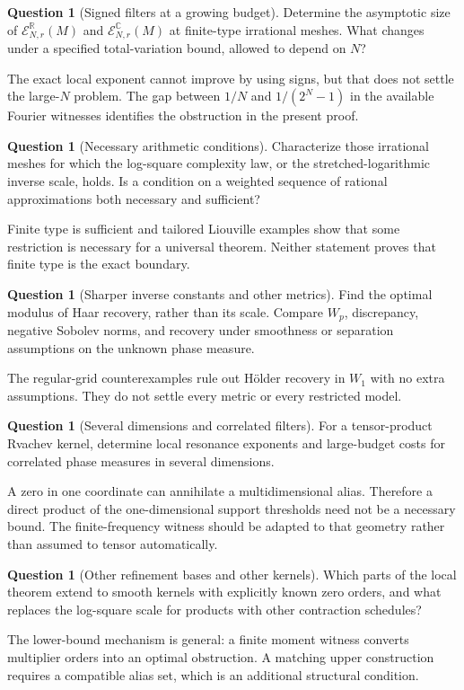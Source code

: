\documentclass[11pt,a4paper]{article}
\numberwithin{equation}{section}
\theoremstyle{plain}
\theoremstyle{definition}
\newtheorem{question}[theorem]{Question}
\theoremstyle{remark}
\newcommand{\R}{\mathbb R}\newcommand{\C}{\mathbb C}
\newcommand{\Err}{\mathcal E}
\begin{document}
\begin{question}[Signed filters at a growing budget]
Determine the asymptotic size of $\Err^{\R}_{N,r}(M)$ and
$\Err^{\C}_{N,r}(M)$ at finite-type irrational meshes. What changes under a
specified total-variation bound, allowed to depend on $N$?
\end{question}
The exact local exponent cannot improve by using signs, but that does not
settle the large-$N$ problem. The gap between $1/N$ and $1/(2^N-1)$ in the
available Fourier witnesses identifies the obstruction in the present proof.

\begin{question}[Necessary arithmetic conditions]
Characterize those irrational meshes for which the log-square complexity law,
or the stretched-logarithmic inverse scale, holds. Is a condition on a
weighted sequence of rational approximations both necessary and sufficient?
\end{question}
Finite type is sufficient and tailored Liouville examples show that some
restriction is necessary for a universal theorem. Neither statement proves
that finite type is the exact boundary.

\begin{question}[Sharper inverse constants and other metrics]
Find the optimal modulus of Haar recovery, rather than its scale. Compare
$W_p$, discrepancy, negative Sobolev norms, and recovery under smoothness or
separation assumptions on the unknown phase measure.
\end{question}
The regular-grid counterexamples rule out H\"older recovery in $W_1$ with no
extra assumptions. They do not settle every metric or every restricted model.

\begin{question}[Several dimensions and correlated filters]
For a tensor-product Rvachev kernel, determine local resonance exponents and
large-budget costs for correlated phase measures in several dimensions.
\end{question}
A zero in one coordinate can annihilate a multidimensional alias. Therefore
a direct product of the one-dimensional support thresholds need not be a
necessary bound. The finite-frequency witness should be adapted to that
geometry rather than assumed to tensor automatically.

\begin{question}[Other refinement bases and other kernels]
Which parts of the local theorem extend to smooth kernels with explicitly
known zero orders, and what replaces the log-square scale for products with
other contraction schedules?
\end{question}
The lower-bound mechanism is general: a finite moment witness converts
multiplier orders into an optimal obstruction. A matching upper construction
requires a compatible alias set, which is an additional structural condition.
\end{document}
